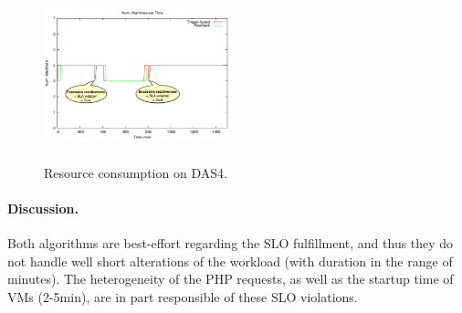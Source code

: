 \begin{figure}[t]
\begin{center}
\includegraphics[width=0.49\textwidth, height=5cm]{./images/homogeneous/explain_DAS4_Provisioning}
\end{center}
\vspace{-5mm}
\caption{Resource consumption on DAS4.}
\label{resComDas4}
\end{figure}

\paragraph{Discussion.}




Both algorithms are best-effort regarding the SLO fulfillment, and
thus they do not handle well short alterations of the workload (with
duration in the range of minutes). The heterogeneity of the PHP
requests, as well as the startup time of VMs (2-5min), are in part
responsible of these SLO violations.

